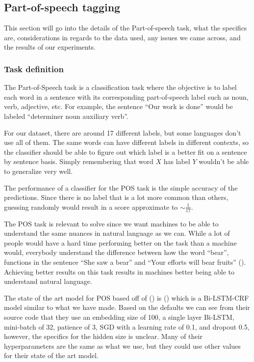 
\subsection{Part-of-speech tagging}

This section will go into the details of the Part-of-speech task, what the
specifics are, considerations in regards to the data used, any issues we came
across, and the results of our experiments.

\subsubsection{Task definition}

The Part-of-Speech task is a classification task where the objective is to label
each word in a sentence with its corresponding part-of-speech label such as
noun, verb, adjective, etc. For example, the sentence ``Our work is done'' would be
labeled ``determiner noun auxiliary verb''.

For our dataset, there are around 17 different labels, but some languages don't
use all of them. The same words can have different labels in different contexts,
so the classifier should be able to figure out which label is a better fit on a
sentence by sentence basis. Simply remembering that word $X$ has label $Y$
wouldn't be able to generalize very well.

The performance of a classifier for the POS task is the simple accuracy of the
predictions. Since there is no label that is a lot more common than others,
guessing randomly would result in a score approximate to $\sim\frac{1}{17}$.

The POS task is relevant to solve since we want machines to be able to
understand the same nuances in natural language as we can. While a lot of people
would have a hard time performing better on the task than a machine would,
everybody understand the difference between how the word ``bear'', functions in
the sentence ``She saw a bear'' and ``Your efforts will bear fruits''
(\cite{medium-pos-intro}). Achieving better results on this task results in
machines better being able to understand natural language.

The state of the art model for POS based off of (\cite{aclweb-pos-state}) is
(\cite{akbik2018coling}) which is a Bi-LSTM-CRF model similar to what we have
made. Based on the defaults we can see from their source code that they use an
embedding size of 100, a single layer Bi-LSTM, mini-batch of 32, patience of 3,
SGD with a learning rate of 0.1, and dropout 0.5, however, the specifics for the
hidden size is unclear. Many of their hyperparameters are the same as what we
use, but they could use other values for their state of the art model. 

